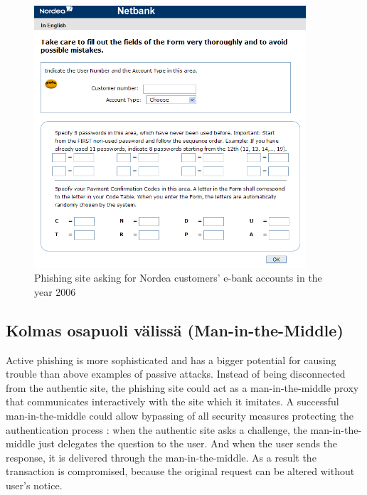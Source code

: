\documentclass[english,gradu]{tktltiki}
\begin{document}
          \begin{figure}
            \centering
            \includegraphics[width=0.9\textwidth]{images/nordea_phishing_website.png}
            \caption{Phishing site asking for Nordea customers' e-bank accounts in the year 2006}
            \label{fig:nordea_phishing_website}
          \end{figure}



\subsection{Kolmas osapuoli välissä (Man-in-the-Middle)} %
\label{sub:kolmas_osapuoli_välissä_man_in_the_middle_}

\label{sec:man_in_the_middle}

Active phishing is more sophisticated and has a bigger potential for causing trouble than above examples of passive attacks. Instead of being disconnected from the authentic site, the phishing site could act as a man-in-the-middle proxy that communicates interactively with the site which it imitates. A successful man-in-the-middle could allow bypassing of all security measures protecting the authentication process \cite{beamauth_2factor_2007, schneier_2factor_2005, why_phishing_works_06}: when the authentic site asks a challenge, the man-in-the-middle just delegates the question to the user. And when the user sends the response, it is delivered through the man-in-the-middle. As a result the transaction is compromised, because the original request can be altered without user's notice.
\end{document}
